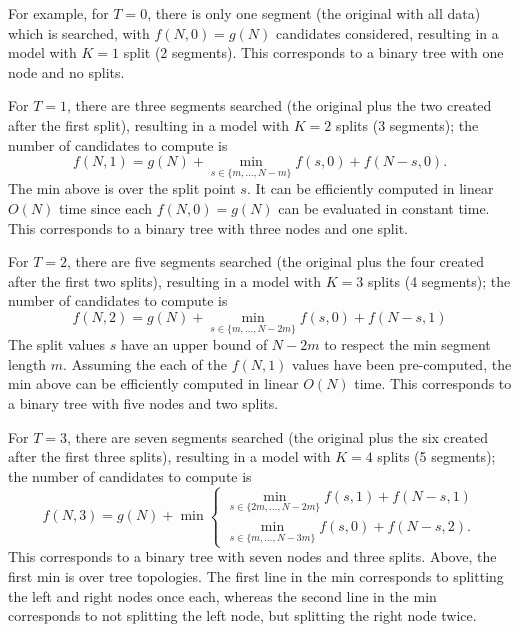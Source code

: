 \documentclass[algorithms,article,accept,oneauthor]{Definitions/mdpi}
\begin{document}
For example, for $T=0$, there is only one segment (the original with all data) which is searched, with $f(N,0)=g(N)$ candidates considered, resulting in a model with $K=1$ split (2 segments).
This corresponds to a binary tree with one node and no splits.

For $T=1$, there are three segments searched (the original plus the two created after the first split), resulting in a model with $K=2$ splits (3 segments); the number of candidates to compute is
\begin{equation}
f(N,1) = g(N) + \min_{s\in\{m,\dots,N-m\}} f(s,0)+f(N-s, 0).
\end{equation}
The min above is over the split point $s$.
It can be efficiently computed in linear $O(N)$ time since each $f(N,0)=g(N)$ can be evaluated in constant time.
This corresponds to a binary tree with three nodes and one split.

For $T=2$, there are five segments searched (the original plus the four created after the first two splits), resulting in a model with $K=3$ splits (4 segments); the number of candidates to compute is
\begin{equation}
f(N,2) = g(N) + 
\min_{s\in\{m,\dots,N-2m\}} f(s,0)+f(N-s, 1)
\end{equation}
The split values $s$ have an upper bound of $N-2m$ to respect the min segment length $m$.
Assuming the each of the $f(N,1)$ values have been pre-computed, the min above can be efficiently computed in linear $O(N)$ time.
This corresponds to a binary tree with five nodes and two splits.

For $T=3$, there are seven segments searched (the original plus the six created after the first three splits), resulting in a model with $K=4$ splits (5 segments); the number of candidates to compute is
\begin{equation}
f(N,3) = g(N) + \min
\begin{cases}
\min_{s\in\{2m,\dots,N-2m\}} f(s,1)+f(N-s, 1)\\
\min_{s\in\{m,\dots,N-3m\}} f(s,0)+f(N-s, 2).
\end{cases}
\end{equation}
This corresponds to a binary tree with seven nodes and three splits.
Above, the first min is over tree topologies.
The first line in the min corresponds to splitting the left and right nodes once each, whereas the second line in the min corresponds to not splitting the left node, but splitting the right node twice.

\end{document}
